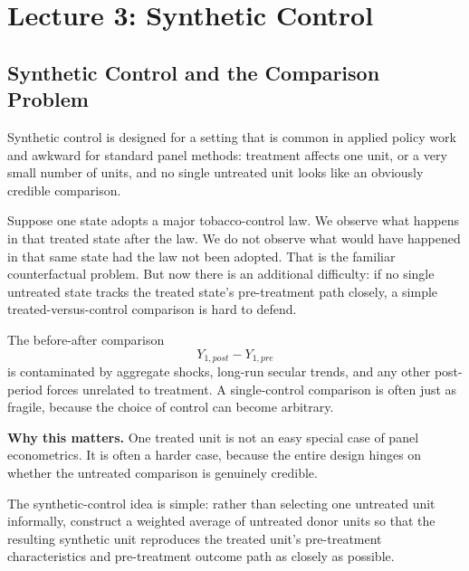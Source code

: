 \section{Lecture 3: Synthetic Control}

\subsection{Synthetic Control and the Comparison Problem}
Synthetic control is designed for a setting that is common in applied policy work and awkward for standard panel methods: treatment affects one unit, or a very small number of units, and no single untreated unit looks like an obviously credible comparison.

Suppose one state adopts a major tobacco-control law. We observe what happens in that treated state after the law. We do not observe what would have happened in that same state had the law not been adopted. That is the familiar counterfactual problem. But now there is an additional difficulty: if no single untreated state tracks the treated state's pre-treatment path closely, a simple treated-versus-control comparison is hard to defend.

The before-after comparison
\begin{equation}
Y_{1,post}-Y_{1,pre}
\label{eq:sc_before_after}
\end{equation}
is contaminated by aggregate shocks, long-run secular trends, and any other post-period forces unrelated to treatment. A single-control comparison is often just as fragile, because the choice of control can become arbitrary.

\begin{boxD}
\textbf{Why this matters.}
One treated unit is not an easy special case of panel econometrics. It is often a harder case, because the entire design hinges on whether the untreated comparison is genuinely credible.
\end{boxD}

The synthetic-control idea is simple: rather than selecting one untreated unit informally, construct a weighted average of untreated donor units so that the resulting synthetic unit reproduces the treated unit's pre-treatment characteristics and pre-treatment outcome path as closely as possible.

